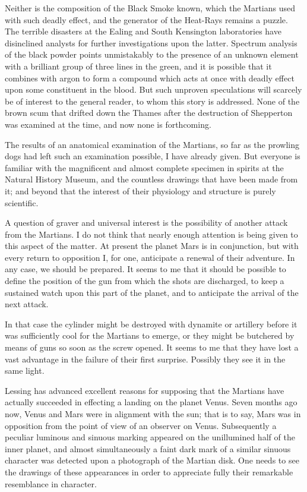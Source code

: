 Neither is the composition of the Black Smoke known, which the
Martians used with such deadly effect, and the generator of the
Heat-Rays remains a puzzle. The terrible disasters at the Ealing
and South Kensington laboratories have disinclined analysts for
further investigations upon the latter. Spectrum analysis of the
black powder points unmistakably to the presence of an unknown
element with a brilliant group of three lines in the green, and it
is possible that it combines with argon to form a compound which
acts at once with deadly effect upon some constituent in the blood.
But such unproven speculations will scarcely be of interest to the
general reader, to whom this story is addressed. None of the brown
scum that drifted down the Thames after the destruction of
Shepperton was examined at the time, and now none is forthcoming.

The results of an anatomical examination of the Martians, so far as
the prowling dogs had left such an examination possible, I have
already given. But everyone is familiar with the magnificent and
almost complete specimen in spirits at the Natural History Museum,
and the countless drawings that have been made from it; and beyond
that the interest of their physiology and structure is purely
scientific.

A question of graver and universal interest is the possibility of
another attack from the Martians. I do not think that nearly enough
attention is being given to this aspect of the matter. At present
the planet Mars is in conjunction, but with every return to
opposition I, for one, anticipate a renewal of their adventure. In
any case, we should be prepared. It seems to me that it should be
possible to define the position of the gun from which the shots are
discharged, to keep a sustained watch upon this part of the planet,
and to anticipate the arrival of the next attack.

In that case the cylinder might be destroyed with dynamite or
artillery before it was sufficiently cool for the Martians to
emerge, or they might be butchered by means of guns so soon as the
screw opened. It seems to me that they have lost a vast advantage
in the failure of their first surprise. Possibly they see it in the
same light.

Lessing has advanced excellent reasons for supposing that the
Martians have actually succeeded in effecting a landing on the
planet Venus. Seven months ago now, Venus and Mars were in
alignment with the sun; that is to say, Mars was in opposition from
the point of view of an observer on Venus. Subsequently a peculiar
luminous and sinuous marking appeared on the unillumined half of
the inner planet, and almost simultaneously a faint dark mark of a
similar sinuous character was detected upon a photograph of the
Martian disk. One needs to see the drawings of these appearances in
order to appreciate fully their remarkable resemblance in
character.

